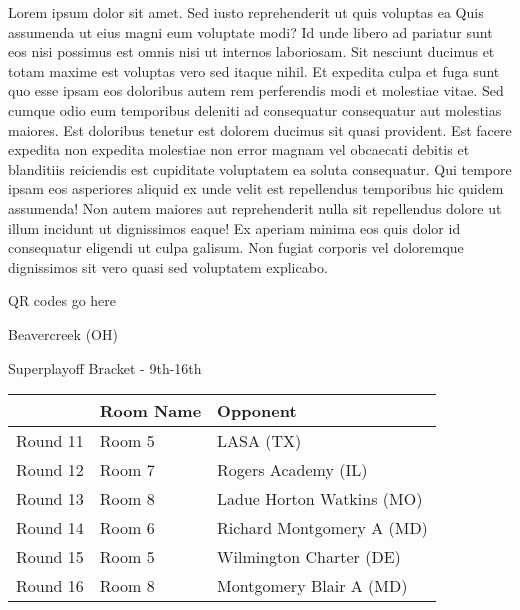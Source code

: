 \documentclass{article}%
\begin{document}
\vspace*{8pt}%
\linebreak%
\newline%
\newline%
    Lorem ipsum dolor sit amet. Sed iusto reprehenderit ut quis voluptas ea Quis assumenda ut eius magni eum voluptate modi? Id unde libero ad pariatur sunt eos nisi possimus est omnis nisi ut internos laboriosam. Sit nesciunt ducimus et totam maxime est voluptas vero sed itaque nihil. Et expedita culpa et fuga sunt quo esse ipsam eos doloribus autem rem perferendis modi et molestiae vitae.\newline%
\newline%
    Sed cumque odio eum temporibus deleniti ad consequatur consequatur aut molestias maiores. Est doloribus tenetur est dolorem ducimus sit quasi provident. Est facere expedita non expedita molestiae non error magnam vel obcaecati debitis et blanditiis reiciendis est cupiditate voluptatem ea soluta consequatur. Qui tempore ipsam eos asperiores aliquid ex unde velit est repellendus temporibus hic quidem assumenda!\newline%
\newline%
    Non autem maiores aut reprehenderit nulla sit repellendus dolore ut illum incidunt ut dignissimos eaque! Ex aperiam minima eos quis dolor id consequatur eligendi ut culpa galisum. Non fugiat corporis vel doloremque dignissimos sit vero quasi sed voluptatem explicabo.\newline%
\newline%
\vspace*{30pt}%
\begin{center}%
\begin{Huge}%
QR codes go here%
\end{Huge}%
\end{center}%
\newpage%
\begin{center}%
\begin{Huge}%
Beavercreek (OH)%
\end{Huge}%
\vspace*{8pt}%
\linebreak%
\begin{Large}%
Superplayoff Bracket {-} 9th{-}16th%
\end{Large}%
\end{center}%
%
\begin{tabularx}{\textwidth}{|c|Y|Y|}%
\hline%
&Room Name&Opponent\\%
\hline%
Round 11&Room 5&LASA (TX)\\%
Round 12&Room 7&Rogers Academy (IL)\\%
Round 13&Room 8&Ladue Horton Watkins (MO)\\%
Round 14&Room 6&Richard Montgomery A (MD)\\%
Round 15&Room 5&Wilmington Charter (DE)\\%
Round 16&Room 8&Montgomery Blair A (MD)\\%
\hline%
\end{tabularx}%
\end{document}
